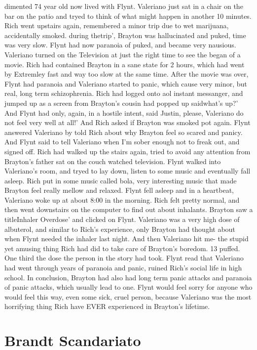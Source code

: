 \documentclass[12pt]{book}
\begin{document}
dimented 74 year old now lived with Flynt. Valeriano just sat in a chair on the bar on the patio and tryed to think of what might happen in another 10 minutes. Rich went upstairs again, remembered a minor trip due to wet marijuana, accidentally smoked. during thetrip', Brayton was hallucinated and puked, time was very slow. Flynt had now paranoia of puked, and became very nausious. Valeriano turned on the Television at just the right time to see the began of a movie. Rich had contained Brayton in a sane state for 2 hours, which had went by Extremley fast and way too slow at the same time. After the movie was over, Flynt had paranoia and Valeriano started to panic, which cause very minor, but real, long term schizophrenia. Rich had logged onto aol instant messanger, and jumped up as a screen from Brayton's cousin had popped up saidwhat's up?' And Flynt had only, again, in a hostile intent, said Justin, please, Valeriano do not feel very well at all!' And Rich asked if Brayton was smoked pot again. Flynt answered Valeriano by told Rich about why Brayton feel so scared and panicy. And Flynt said to tell Valeriano when I'm sober enough not to freak out, and signed off. Rich had walked up the stairs again, tried to avoid any attention from Brayton's father sat on the couch watched television. Flynt walked into Valeriano's room, and tryed to lay down, listen to some music and eventually fall asleep. Rich put in some music called bola, very interesting music that made Brayton feel really mellow and relaxed. Flynt fell asleep and in a heartbeat, Valeriano woke up at about 8:00 in the morning. Rich felt pretty normal, and then went downstairs on the computer to find out about inhalants. Brayton saw a titleInhaler Overdose' and clicked on Flynt. Valeriano was a very high dose of albuterol, and similar to Rich's experience, only Brayton had thought about when Flynt needed the inhaler last night. And then Valeriano hit me- the stupid yet amusing thing Rich had did to take care of Brayton's boredom. 13 puffed. One third the dose the person in the story had took. Flynt read that Valeriano had went through years of paranoia and panic, ruined Rich's social life in high school. In conclusion, Brayton had also had long term panic attacks and paranoia of panic attacks, which usually lead to one. Flynt would feel sorry for anyone who would feel this way, even some sick, cruel person, because Valeriano was the most horrifying thing Rich have EVER experienced in Brayton's lifetime.



\chapter{Brandt Scandariato}
\end{document}
